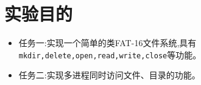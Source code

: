 \section{实验目的}
\begin{itemize}
    \item 任务一:实现一个简单的类FAT-16文件系统,具有\texttt{mkdir,delete,open,read,write,close}等功能。
    \item 任务二:实现多进程同时访问文件、目录的功能。
\end{itemize}